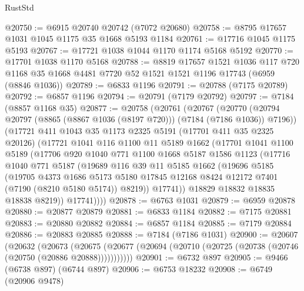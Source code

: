 \begin{lexlean}{RustStd}
\begin{coremodule}
@20750 := @6915 @20740 @20742 (@7072 @20680)
@20758 := @8795 @17657 @1031 @1045 @1175 @35 @1668 @5193 @1184
@20761 := @17716 @1045 @1175 @5193
@20767 := @17721 @1038 @1044 @1170 @1174 @5168 @5192
@20770 := @17701 @1038 @1170 @5168
@20788 := @8819
    @17657
    @1521
    @1036
    @117
    @720
    @1168
    @35
    @1668
    @4481
    @7720
    @52
    @1521
    @1521
    @1196
    @17743
    (@6959 (@8846 @1036))
@20789 := @6833 @1196
@20791 := @20788 (@7175 @20789)
@20792 := @6857 @1196
@20794 := @20791 (@7179 @20792)
@20797 := @7184 (@8857 @1168 @35)
@20877 := @20758
    (@20761
      (@20767
        (@20770 (@20794 @20797 (@8865 (@8867 @1036 (@8197 @720))) (@7184 (@7186 @1036)) @7196))
        (@17721
          @411
          @1043
          @35
          @1173
          @2325
          @5191
          (@17701 @411 @35 @2325 @20126)
          (@17721
            @1041
            @116
            @1100
            @11
            @5189
            @1662
            (@17701
              @1041
              @1100
              @5189
              (@17706
                @920
                @1040
                @771
                @1100
                @1668
                @5187
                @1586
                @1123
                (@17716
                  @1040
                  @771
                  @5187
                  (@19689
                    @116
                    @39
                    @11
                    @5185
                    @1662
                    (@19696
                      @5185
                      (@19705
                        @4373
                        @1686
                        @5173
                        @5180
                        @17845
                        @12168
                        @8424
                        @12172
                        @7401
                        (@7190 (@8210 @5180 @5174))
                        @8219))
                    @17741))
                @18829
                @18832
                @18835
                @18838
                @8219))
            @17741))))
@20878 := @6763 @1031
@20879 := @6959 @20878
@20880 := @20877 @20879
@20881 := @6833 @1184
@20882 := @7175 @20881
@20883 := @20880 @20882
@20884 := @6857 @1184
@20885 := @7179 @20884
@20886 := @20883 @20885
@20888 := @7184 (@7186 @1031)
@20900 := @20607
    (@20632
      (@20673
        (@20675 (@20677 (@20694 (@20710 (@20725 (@20738 (@20746 (@20750 (@20886 @20888)))))))))))
@20901 := @6732 @897
@20905 := @9466 (@6738 @897) (@6744 @897)
@20906 := @6753 @18232
@20908 := @6749 (@20906 @9478)

\end{coremodule}
\end{lexlean}
